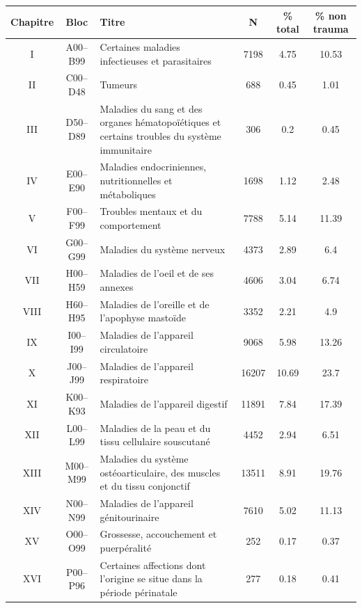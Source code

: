 \documentclass[12pt,english,french,twoside]{report}\usepackage[]{graphicx}\usepackage[]{color}
\begin{document}
\begin{longtable}{|c|c|m{4cm}|c|c|c|}
 \hline
 Chapitre & Bloc & Titre & N & \% total  & \% non trauma \\
 \hline
 
I & A00–B99 & Certaines maladies infectieuses et parasitaires & 7198 & 4.75 & 10.53 \\
 II&C00–D48&Tumeurs&688&0.45&1.01\\
 
III&D50–D89&Maladies du sang et des organes hématopoïétiques et certains troubles du système immunitaire&306&0.2&0.45\\

IV&E00–E90&Maladies endocriniennes, nutritionnelles et métaboliques&1698&1.12&2.48\\

V&F00–F99&Troubles mentaux et du comportement&7788&5.14&11.39\\

VI&G00–G99&Maladies du système nerveux&4373&2.89&6.4\\

VII & H00–H59 & Maladies de l'oeil et de ses annexes & 4606 & 3.04&6.74\\

VIII&H60–H95&Maladies de l'oreille et de l'apophyse mastoïde&3352&2.21&4.9\\

IX&I00–I99&Maladies de l'appareil circulatoire&9068&5.98&13.26\\

X&J00–J99&Maladies de l'appareil respiratoire&16207&10.69&23.7\\

XI&K00–K93&Maladies de l'appareil digestif&11891&7.84&17.39\\

XII&L00–L99&Maladies de la peau et du tissu cellulaire souscutané&4452&2.94&6.51\\

XIII&M00–M99&Maladies du système ostéoarticulaire, des muscles et du tissu conjonctif&13511&8.91&19.76\\

XIV&N00–N99&Maladies de l'appareil génitourinaire&7610&5.02&11.13\\

XV&O00–O99&Grossesse, accouchement et puerpéralité&252&0.17&0.37\\

XVI&P00–P96&Certaines affections dont l'origine se situe dans la période périnatale&277&0.18&0.41\\


\end{longtable}
\end{document}
